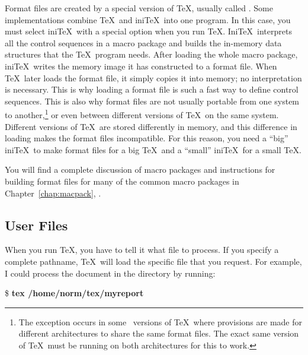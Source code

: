 \label{run:sec:initexintro}
Format files are created by a special version of \TeX, usually called
.  Some implementations combine \TeX\ and ini\TeX\ into
one program.  In this case, you must select ini\TeX\ with a special
option when you run \TeX.  Ini\TeX\ interprets all the control
sequences in a macro package and builds the in-memory data structures
that the \TeX\ program needs.  After loading the whole macro package,
ini\TeX\ writes the memory image it has constructed to a format
file.  When \TeX\ later loads the format file, it simply copies it
into memory; no interpretation is necessary.  This is why loading a
format file is such a fast way to define control 
sequences.  This is
also why format files are not usually portable from one system to
another,\footnote{The exception occurs in some \Unix\ versions of \TeX\
where provisions are made for different architectures to share the
same format files.  The exact same version of \TeX\ must be running on
both architectures for this to work.} or even between different
versions of \TeX\ on the same system.  Different versions of \TeX\
are stored differently 
in memory, and this difference in loading makes the
format files incompatible.  For this reason, you need a ``big''
ini\TeX\ to make format files for a big \TeX\ and a ``small'' ini\TeX\ for
a small \TeX.

You will find a complete discussion of macro packages and 
instructions for building format files for many of the common macro 
packages in Chapter~\ref{chap:macpack},
\textit{\nameref{chap:macpack}}.

\subsection{User Files}
\label{sec:userfiles}

When you run \TeX{}, you have to tell it what file to process.
If you specify a complete pathname, \TeX\ will load the specific file that you
request.  For example, I could process the document \filename{myreport.tex} in
the directory \filename{/home/norm/tex/} by running:

\begin{ttindent}
\$ \textbf{tex /home/norm/tex/myreport}
\end{ttindent}

